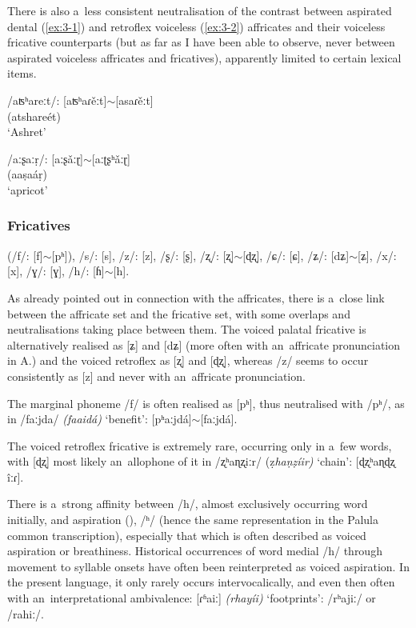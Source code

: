 There is also a~less consistent neutralisation of the contrast between aspirated dental (\ref{ex:3-1}) and retroflex voiceless (\ref{ex:3-2}) affricates and their voiceless fricative counterparts (but as far as I have been able to observe, never between aspirated voiceless affricates and fricatives), apparently limited to certain lexical items. 

\begin{exe}
\ex
\label{ex:3-1}
\gll /aʦʰareːt/: [aʦʰaɾěːt]$\sim$[asaɾěːt] \\
(atshareét) \\
\glt `Ashret'

\ex
\label{ex:3-2}
\gll /aːʂaːṛ/: [aːʂǎːɽ]$\sim$[aːʈʂʰǎːɽ] \\
(aaṣaáṛ) \\
\glt `apricot'
\end{exe}

\subsubsection*{Fricatives}

(/f/: [f]$\sim$[pʰ]), /s/: [s], /z/: [z], /ʂ/: [ʂ], /ʐ/: [ʐ]$\sim$[ɖʐ], /ɕ/: [ɕ], /ʑ/: [dʑ]$\sim$[ʑ], /x/: [x], /ɣ/: [ɣ], /h/: [ɦ]$\sim$[h].


As already pointed out in connection with the affricates, there is a~close link between the affricate set and the fricative set, with some overlaps and neutralisations taking place between them. The voiced palatal fricative is alternatively realised as [ʑ] and [dʑ] (more often with an~affricate pronunciation in A.) and the voiced retroflex as [ʐ] and [ɖʐ], whereas /z/ seems to occur consistently as [z] and never with an~affricate pronunciation.


The marginal phoneme /f/ is often realised as [pʰ], thus neutralised with /pʰ/, as in /faːjda/ \textit{(faaidá)} `benefit': [pʰaːjdá]$\sim$[faːjdá].


The voiced retroflex fricative is extremely rare, occurring only in a~few words, with [ɖʐ] most likely an~allophone of it in /ʐʰaɳʐiːr/ (ẓ\textit{haṇẓíir)} `chain': [ɖʐʰaɳɖʐ îːɾ]. 


There is a~strong affinity between /h/, almost exclusively occurring word initially, and aspiration (), /ʰ/ (hence the same representation in the Palula common transcription), especially that which is often described as voiced aspiration or breathiness. Historical occurrences of word medial /h/ through movement to syllable onsets have often been reinterpreted as voiced aspiration. In the present language, it only rarely occurs intervocalically, and even then often with an~interpretational ambivalence: [ɾʱaiː] \textit{(rhayíi)} `footprints': /rʰajiː/ or /rahiː/.


